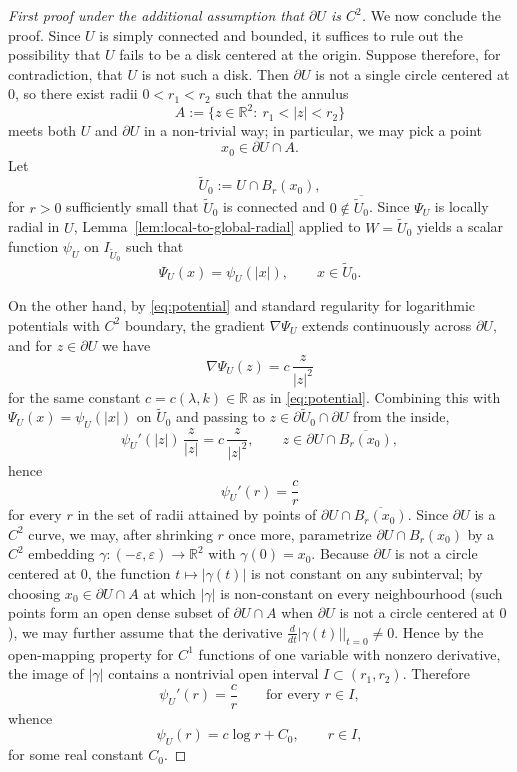 \documentclass[a4paper,11pt,reqno]{amsart}
\numberwithin{equation}{section}
\theoremstyle{plain} %
\theoremstyle{definition} %
\theoremstyle{remark}
\newcommand{\R}{\mathbb{R}}
\begin{document}
\begin{proof}[First proof under the additional assumption that $\partial U$ is $C^2$]
We now conclude the proof. Since \(U\) is simply connected and bounded,
it suffices to rule out the possibility that \(U\) fails to be a disk
centered at the origin. Suppose therefore, for contradiction, that
\(U\) is not such a disk. Then \(\partial U\) is not a single circle
centered at $0$, so there exist radii \(0<r_1<r_2\) such that the
annulus
\[
A:=\{z\in \R^2:\ r_1<|z|<r_2\}
\]
meets both $U$ and $\partial U$ in a non-trivial way; in particular,
we may pick a point
\[
x_0\in \partial U\cap A.
\]
Let
\[
\widetilde{U}_0:=U\cap B_r(x_0),
\]
for $r>0$ sufficiently small that $\widetilde U_0$ is connected and
$0\notin \overline{\widetilde U_0}$. Since \(\Psi_U\) is locally radial
in \(U\), Lemma~\ref{lem:local-to-global-radial} applied to
$W=\widetilde U_0$ yields a scalar function \(\psi_U\) on
$I_{\widetilde U_0}$ such that
\[
\Psi_U(x)=\psi_U(|x|),\qquad x\in \widetilde{U}_0.
\]

On the other hand, by \eqref{eq:potential} and standard regularity for
logarithmic potentials with $C^2$ boundary, the gradient $\nabla\Psi_U$
extends continuously across $\partial U$, and for $z\in\partial U$ we
have
\[
\nabla \Psi_U(z)=c\,\frac{z}{|z|^2}
\]
for the same constant $c=c(\lambda,k)\in \R$ as in
\eqref{eq:potential}. Combining this with $\Psi_U(x)=\psi_U(|x|)$ on
$\widetilde U_0$ and passing to $z\in \partial \widetilde U_0\cap
\partial U$ from the inside,
\[
\psi_U'(|z|)\,\frac{z}{|z|}=c\,\frac{z}{|z|^2},
\qquad z\in \partial U\cap \overline{B_r(x_0)},
\]
hence
\[
\psi_U'(r)=\frac{c}{r}
\]
for every $r$ in the set of radii attained by points of
$\partial U\cap \overline{B_r(x_0)}$. Since $\partial U$ is a $C^2$
curve, we may, after shrinking $r$ once more, parametrize
$\partial U\cap B_r(x_0)$ by a $C^2$ embedding
$\gamma:(-\varepsilon,\varepsilon)\to \R^2$ with $\gamma(0)=x_0$.
Because $\partial U$ is not a circle centered at $0$, the function
$t\mapsto |\gamma(t)|$ is not constant on any subinterval; by choosing
$x_0\in\partial U\cap A$ at which $|\gamma|$ is non-constant on every
neighbourhood (such points form an open dense subset of $\partial
U\cap A$ when $\partial U$ is not a circle centered at $0$), we may
further assume that the derivative
$\frac{d}{dt}|\gamma(t)|\big|_{t=0}\ne 0$. Hence by the open-mapping
property for $C^1$ functions of one variable with nonzero derivative,
the image of $|\gamma|$ contains a nontrivial open interval
\(I\subset (r_1,r_2)\).
Therefore
\[
\psi_U'(r)=\frac{c}{r}
\qquad\text{for every }r\in I,
\]
whence
\[
\psi_U(r)=c\log r+C_0,
\qquad r\in I,
\]
for some real constant $C_0$.


\end{proof}
\end{document}

